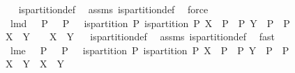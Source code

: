 \begin{isabellebody}
\isadelimproof
\ %
\endisadelimproof
%
\isatagproof
{}\isamarkupfalse%
\ is{\isacharunderscore}partition{\isacharunderscore}def\ \isamarkupfalse%
\ assms\ is{\isacharunderscore}partition{\isacharunderscore}def\ \isamarkupfalse%
\ force%
\endisatagproof
{\isafoldproof}%
%
\isadelimproof
%
\endisadelimproof
\isanewline
\isanewline
{}\isamarkupfalse%
\ lm{}{}d{\isacharcolon}\ \ {\isachardoublequoteopen}{\isasymUnion}\ P{}\ {\isasyminter}\ {\isacharparenleft}{\isasymUnion}\ P{}{\isacharparenright}\ {\isacharequal}\ {\isacharbraceleft}{\isacharbraceright}{\isachardoublequoteclose}\ {\isachardoublequoteopen}is{\isacharunderscore}partition\ P{}{\isachardoublequoteclose}\ {\isachardoublequoteopen}is{\isacharunderscore}partition\ P{}{\isachardoublequoteclose}\ {\isachardoublequoteopen}X\ {\isasymin}\ P{}\ {\isasymunion}\ P{}{\isachardoublequoteclose}\ {\isachardoublequoteopen}Y\ {\isasymin}\ P{}\ {\isasymunion}\ P{}{\isachardoublequoteclose}\isanewline
{\isachardoublequoteopen}X\ {\isasyminter}\ Y\ {\isasymnoteq}\ {\isacharbraceleft}{\isacharbraceright}{\isachardoublequoteclose}\ \ {\isachardoublequoteopen}{\isacharparenleft}X\ {\isacharequal}\ Y{\isacharparenright}{\isachardoublequoteclose}%
\isadelimproof
\ %
\endisadelimproof
%
\isatagproof
{}\isamarkupfalse%
\ is{\isacharunderscore}partition{\isacharunderscore}def\ \isamarkupfalse%
\ assms\ is{\isacharunderscore}partition{\isacharunderscore}def\ \isamarkupfalse%
\ fast%
\endisatagproof
{\isafoldproof}%
%
\isadelimproof
%
\endisadelimproof
\isanewline
\isanewline
{}\isamarkupfalse%
\ lm{}{}e{\isacharcolon}\ \ {\isachardoublequoteopen}{\isasymUnion}\ P{}\ {\isasyminter}\ {\isacharparenleft}{\isasymUnion}\ P{}{\isacharparenright}\ {\isacharequal}\ {\isacharbraceleft}{\isacharbraceright}{\isachardoublequoteclose}\ {\isachardoublequoteopen}is{\isacharunderscore}partition\ P{}{\isachardoublequoteclose}\ {\isachardoublequoteopen}is{\isacharunderscore}partition\ P{}{\isachardoublequoteclose}\ {\isachardoublequoteopen}X\ {\isasymin}\ P{}\ {\isasymunion}\ P{}{\isachardoublequoteclose}\ {\isachardoublequoteopen}Y\ {\isasymin}\ P{}\ {\isasymunion}\ P{}{\isachardoublequoteclose}\isanewline
{\isachardoublequoteopen}{\isacharparenleft}X\ {\isacharequal}\ Y{\isacharparenright}{\isachardoublequoteclose}\ \ {\isachardoublequoteopen}X\ {\isasyminter}\ Y\ {\isasymnoteq}\ {\isacharbraceleft}{\isacharbraceright}{\isachardoublequoteclose}%

\end{isabellebody}
